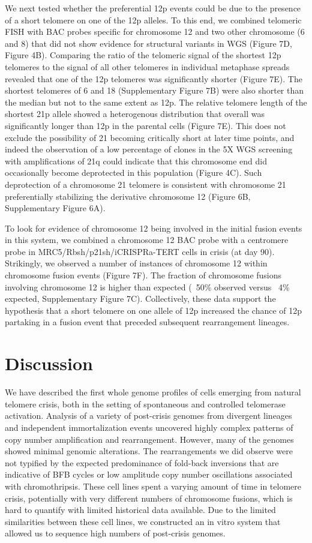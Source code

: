 \documentclass[phd,tocprelim]{cornell}
\begin{document}
We next tested whether the preferential 12p events could be due to the presence of a short telomere on one of the 12p alleles. To this end, we combined telomeric FISH with BAC probes specific for chromosome 12 and two other chromosome (6 and 8) that did not show evidence for structural variants in WGS (Figure 7D, Figure 4B). Comparing the ratio of the telomeric signal of the shortest 12p telomeres to the signal of all other telomeres in individual metaphase spreads revealed that one of the 12p telomeres was significantly shorter (Figure 7E). The shortest telomeres of 6 and 18 (Supplementary Figure 7B) were also shorter than the median but not to the same extent as 12p. The relative telomere length of the shortest 21p allele showed a heterogenous distribution that overall was significantly longer than 12p in the parental cells (Figure 7E). This does not exclude the possibility of 21 becoming critically short at later time points, and indeed the observation of a low percentage of clones in the 5X WGS screening with amplifications of 21q could indicate that this chromosome end did occasionally become deprotected in this population (Figure 4C). Such deprotection of a chromosome 21 telomere is consistent with chromosome 21 preferentially stabilizing the derivative chromosome 12 (Figure 6B, Supplementary Figure 6A). 

To look for evidence of chromosome 12 being involved in the initial fusion events in this system, we combined a chromosome 12 BAC probe with a centromere probe in MRC5/Rbsh/p21sh/iCRISPRa-TERT cells in crisis (at day 90). Strikingly, we observed a number of instances of chromosome 12 within chromosome fusion events (Figure 7F). The fraction of chromosome fusions involving chromosome 12 is higher than expected (~50\% observed versus ~4\% expected, Supplementary Figure 7C). Collectively, these data support the hypothesis that a short telomere on one allele of 12p increased the chance of 12p partaking in a fusion event that preceded subsequent rearrangement lineages.   


\section{Discussion}

We have described the first whole genome profiles of cells emerging from natural telomere crisis, both in the setting of spontaneous and controlled telomerase activation. Analysis of a variety of post-crisis genomes from divergent lineages and independent immortalization events uncovered highly complex patterns of copy number amplification and rearrangement. However, many of the genomes showed minimal genomic alterations. The rearrangements we did observe were not typified by the expected predominance of fold-back inversions that are indicative of BFB cycles or low amplitude copy number oscillations associated with chromothripsis. These cell lines spent a varying amount of time in telomere crisis, potentially with very different numbers of chromosome fusions, which is hard to quantify with limited historical data available. Due to the limited similarities between these cell lines, we constructed an in vitro system that allowed us to sequence high numbers of post-crisis genomes. 
\end{document}
